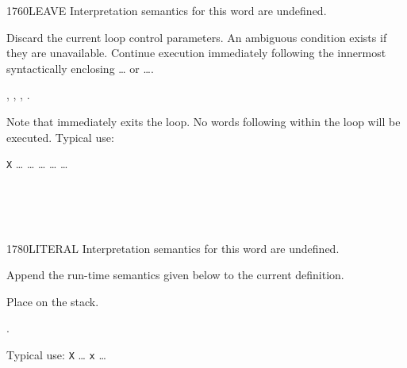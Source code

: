 \vspace*{-2ex}
\enlargethispage{6ex}
\begin{worddef}{1760}{LEAVE}
\interpret
	Interpretation semantics for this word are undefined.

\execute
	\stack{}{}

	Discard the current loop control parameters. An ambiguous condition
	exists if they are unavailable. Continue execution immediately
	following the innermost syntactically enclosing
	\ldots{} or \ldots{}.

\see {},
	,
	,
	.

	\begin{rationale} %
		Note that  immediately exits the loop. No words
		following  within the loop will be executed.
		Typical use:

		\tab \word{:} \texttt{X} {\ldots} 
			{\ldots} 
				{\ldots} 
			 {\ldots}  {\ldots}
		\word{;}
	\end{rationale}

	\begin{testing} %
		 \\
		 \\
		 \\
	\end{testing}
\end{worddef}


\begin{worddef}{1780}{LITERAL}
\interpret
	Interpretation semantics for this word are undefined.

\compile

	Append the run-time semantics given below to the current definition.

\runtime

	Place  on the stack.

\see {}.

	\begin{rationale} %
		Typical use:
			\word{:} \texttt{X} {\ldots}
				\word{[} \texttt{x} \word{]} 
			{\ldots} \word{;}
	\end{rationale}

	\begin{testing} %
		 \\
	\end{testing}
\end{worddef}


